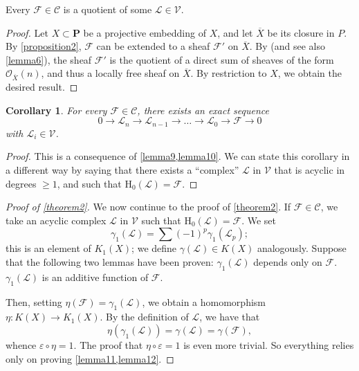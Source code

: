 \documentclass{article}
\theoremstyle{plain}
\newenvironment{lemma}[1]
    {\renewcommand\theinnercustomlemma{#1}\innercustomlemma}
    {\endinnercustomlemma}
\newtheorem*{corollary}{Corollary}
\theoremstyle{definition}
\newcommand{\sh}[1]{{\mathscr{#1}}}
\newcommand{\cat}[1]{{\mathcal{#1}}}
\newcommand{\HH}{\mathrm{H}}
\newcommand{\PP}{\mathbf{P}}
\renewcommand{\geq}{\geqslant}
\newcommand{\oldpage}[1]{\marginpar{\footnotesize$\Big\vert$ \textit{p.~#1}}}
\begin{document}
\begin{lemma}{10}
\label{lemma10}
  Every $\sh{F}\in\cat{C}$ is a quotient of some $\sh{L}\in\cat{V}$.
\end{lemma}

\begin{proof}
  Let $X\subset \PP$ be a projective embedding of $X$, and let $\overline{X}$ be its closure in $P$.
  By \cref{proposition2}, $\sh{F}$ can be extended to a sheaf $\sh{F}'$ on $\overline{X}$.
  By \cite[th\'{e}or\`{e}me~1, p.~247]{12} (and see also \cref{lemma6}), the sheaf $\sh{F}'$ is the quotient of a direct sum of sheaves of the form $\sh{O}_{\overline{X}}(n)$, and thus a locally free sheaf on $\overline{X}$.
  By restriction to $X$, we obtain the desired result.
\end{proof}

\begin{corollary}
  For every $\sh{F}\in\cat{C}$, there exists an exact sequence
  \[
    0\to\sh{L}_n\to\sh{L}_{n-1}\to\ldots\to\sh{L}_0\to\sh{F}\to0
  \]
  with $\sh{L}_i\in\cat{V}$.
\end{corollary}

\begin{proof}
  This is a consequence of \cref{lemma9,lemma10}.
  We can state this corollary in a different way by saying that there exists a ``complex'' $\sh{L}$ in $\cat{V}$ that is acyclic in degrees $\geq1$, and such that $\HH_0(\sh{L})=\sh{F}$.
\end{proof}

\begin{proof}[Proof of \cref{theorem2}]
  We now continue to the proof of \cref{theorem2}.
  If $\sh{F}\in\cat{C}$, we take an acyclic complex $\sh{L}$ in $\cat{V}$ such that $\HH_0(\sh{L})=\sh{F}$.
  We set
  \[
    \gamma_1(\sh{L}) = \sum(-1)^p\gamma_1(\sh{L}_p);
  \]
  this is an element of $K_1(X)$;
  we define $\gamma(\sh{L})\in K(X)$ analogously.
  Suppose that the following two lemmas have been proven:
  \begin{lemma}{11}
  \label{lemma11}
    $\gamma_1(\sh{L})$ depends only on $\sh{F}$.
  \end{lemma}
  \begin{lemma}{12}
  \label{lemma12}
    $\gamma_1(\sh{L})$ is an additive function of $\sh{F}$.
  \end{lemma}

  Then, setting $\eta(\sh{F})=\gamma_1(\sh{L})$, we obtain a homomorphism $\eta\colon K(X)\to K_1(X)$.
  By the definition of $\sh{L}$, we have that
  \[
    \eta(\gamma_1(\sh{L})) = \gamma(\sh{L}) = \gamma(\sh{F}),
  \]
  whence $\varepsilon\circ\eta=1$.
  \oldpage{107}
  The proof that $\eta\circ\varepsilon=1$ is even more trivial.
  So everything relies only on proving \cref{lemma11,lemma12}.
\end{proof}
\end{document}
